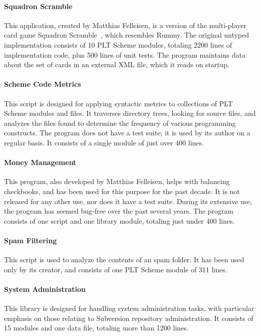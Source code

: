 \begin{schemeregion}
\paragraph{Squadron Scramble}
This application, created by Matthias Felleisen, is a version of the
multi-player card game Squadron Scramble~\cite{squadron-scramble},
which resembles Rummy.  The
original untyped implementation consists of 10 PLT Scheme modules,
totaling 2200 lines of implementation code, plus 500 lines of
unit tests.  The program maintains data about the set of cards in an
external XML file, which it reads on startup.

\paragraph{Scheme Code Metrics}
This script is designed for applying syntactic metrics to collections
of PLT Scheme modules and files.  It traverses directory trees,
looking for source files, and analyzes the files found to
determine the frequency of various programming constructs. 
The program does not have a test suite; it is used by its author on a
regular basis.  It consists of a single module of just over
400 lines.

\paragraph{Money Management}
This program, also developed by Matthias Felleisen, helps with balancing
checkbooks, and has been used for this purpose for the past decade.  It
is not released for any other use, nor does it have a test suite.
During its extensive use, the program has seemed bug-free over the
past several years.  The program consists of one script and one
library module, totaling just under 400 lines.

\paragraph{Spam Filtering}
This script is used to analyze the contents of an
spam folder.  It has been used only by its creator, and
consists of one PLT Scheme module of 311 lines.

\paragraph{System Administration}
This library is designed for handling system administration tasks,
with particular emphasis on those relating to Subversion repository administration.
It consists of 15 modules and one data file, totaling more than 1200 lines.  


\end{schemeregion}
